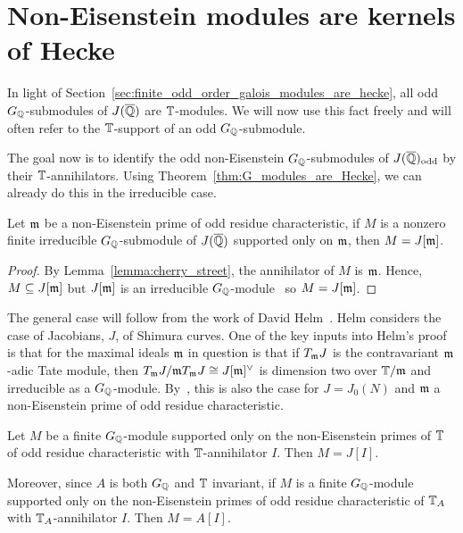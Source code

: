 \documentclass[11pt, proquest]{uwthesis}
\begin{document}
\section{Non-Eisenstein modules are kernels of Hecke}%
\label{sec:non_eisenstein_modules_are_kernels_of_hecke}

In light of Section~\ref{sec:finite_odd_order_galois_modules_are_hecke}, all
odd $G_{\mathbb{Q}}$-submodules of $J(\overline{\mathbb{Q}})$ are $\mathbb{T}$-modules. We will now
use this fact freely and will often refer to the $\mathbb{T}$-support of an odd
$G_{\mathbb{Q}}$-submodule.

The goal now is to identify the odd non-Eisenstein $G_{\mathbb{Q}}$-submodules of
$J(\overline{\mathbb{Q}})_{\mathrm{odd}}$ by their $\mathbb{T}$-annihilators. Using
Theorem~\ref{thm:G_modules_are_Hecke}, we can already do this in the
irreducible case.
\begin{corollary}
    Let $\mathfrak{m}$ be a non-Eisenstein prime of odd residue characteristic, if $M$ is
    a nonzero finite irreducible $G_{\mathbb{Q}}$-submodule of $J(\overline{\mathbb{Q}})$ supported
    only on $\mathfrak{m}$, then $M=J[\mathfrak{m}]$.
\end{corollary}
\begin{proof}
    By Lemma~\ref{lemma:cherry_street}, the annihilator of $M$ is $\mathfrak{m}$. Hence,
    $M\subseteq J[\mathfrak{m}]$ but $J[\mathfrak{m}]$ is an irreducible
    $G_{\mathbb{Q}}$-module~\cite[Proposition 14.2]{mazur:eisenstein} so $M=J[\mathfrak{m}]$.
\end{proof}

The general case will follow from the work of David Helm~\cite{helm:jacobian}.
Helm considers the case of Jacobians, $J$, of Shimura curves. One of the key
inputs into Helm's proof is that for the maximal ideals $\mathfrak{m}$ in question is
that if $T_{\mathfrak{m}} J$ is the contravariant $\mathfrak{m}$-adic Tate module, then $T_{\mathfrak{m}} J/\mathfrak{m}
T_{\mathfrak{m}} J\cong J[\mathfrak{m}]^\vee$ is dimension two over $\mathbb{T}/\mathfrak{m}$ and irreducible as a
$G_{\mathbb{Q}}$-module. By~\cite[Prop. 14.2]{mazur:eisenstein}, this is also the case
for $J=J_0(N)$ and $\mathfrak{m}$ a non-Eisenstein prime of odd residue characteristic.

\begin{theorem}%
    \label{thm:non_eisenstein_kernel_hecke}
    Let $M$ be a finite $G_{\mathbb{Q}}$-module supported only on the non-Eisenstein
    primes of $\mathbb{T}$ of odd residue characteristic with $\mathbb{T}$-annihilator $I$.
    Then $M=J[I]$.

    Moreover, since $A$ is both $G_{\mathbb{Q}}$ and $\mathbb{T}$ invariant, if $M$ is a finite
    $G_{\mathbb{Q}}$-module supported only on the non-Eisenstein primes of odd residue
    characteristic of $\mathbb{T}_A$ with $\mathbb{T}_A$-annihilator $I$. Then $M=A[I]$.
\end{theorem}
\end{document}

